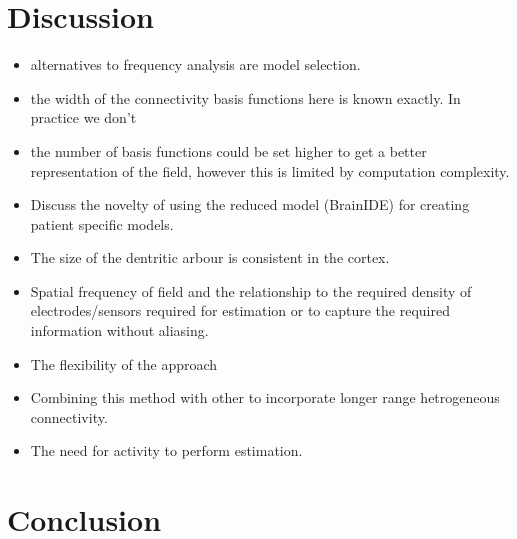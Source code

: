 \documentclass[12pt]{iopart}		%
\begin{document}
\section{Discussion}

\begin{itemize}
	\item alternatives to frequency analysis are model selection.
	\item the width of the connectivity basis functions here is known exactly. In practice we don't 
	\item the number of basis functions could be set higher to get a better representation of the field, however this is limited by computation complexity.
	\item Discuss the novelty of using the reduced model (BrainIDE) for creating patient specific models. 
	\item The size of the dentritic arbour is consistent in the cortex.
	\item Spatial frequency of field and the relationship to the required density of electrodes/sensors required for estimation or to capture the required information without aliasing.
	\item The flexibility of the approach
	\item Combining this method with other to incorporate longer range hetrogeneous connectivity.	
	\item The need for activity to perform estimation.
\end{itemize}

\section{Conclusion}
\appendix
\end{document}
